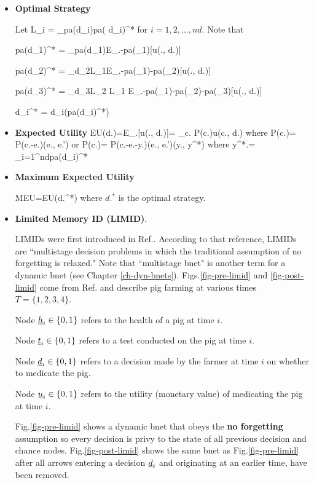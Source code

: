\begin{itemize}


\item{\bf Optimal Strategy}

Let
\beq
L_i = \lim_{pa(d_i)\rarrow pa( d_i)^*}
\eeq
for $i=1,2, \ldots, nd$.
Note that



\beq
pa(d_1)^* = \argmax_{pa(d_1)}E_{\rvc.-pa(\rvd_1)}[u(\rvc., d.)]
\eeq


\beq 
pa(d_2)^* = \argmax_{d_2}L_1E_{\rvc.-pa(\rvd_1)-pa(\rvd_2)}[u(\rvc., d.)]
\eeq

\beq 
pa(d_3)^* = \argmax_{d_3}L_2 L_1 E_{\rvc.-pa(\rvd_1)-pa(\rvd_2)-pa(\rvd_3)}[u(\rvc., d.)]
\eeq

\beq
d_i^* = d_i(pa(d_i)^*)
\eeq


\item {\bf Expected Utility}
\beq
EU(d.)=E_{\rvc.}[u(\rvc., d.)]=
\sum_{c.} P(c.)u(c., d.)
\eeq
where 
\beq
P(c.)= P(c.-e.)\delta(e., e.')
\eeq
or
\beq
P(c.)= P(c.-e.-y.)\delta(e., e.')\delta(y., y^*)
\eeq
where 
\beq 
y^*.= \cup_{i=1}^{nd}pa(d_i)^*
\eeq


\item {\bf Maximum Expected Utility}

\beq
MEU=EU(d.^*)
\eeq
where $d.^*$ is the optimal strategy.


\item {\bf Limited Memory ID (LIMID)}. 

LIMIDs were first introduced 
in Ref.\cite{limid-one}. According to that reference, LIMIDs are ``multistage decision problems in which the traditional assumption of no forgetting is
relaxed." 
Note that ``multistage bnet" is another term
for a dynamic bnet (see Chapter \ref{ch-dyn-bnets}).
Figs.\ref{fig-pre-limid} and \ref{fig-post-limid}
come from Ref.\cite{limid-one} and describe pig farming
at various times $T=\{1,2,3,4\}$.

Node ${\underline{h}}_i\in\{0,1\}$
refers to the health of a pig at time $i$.

Node ${\underline{t}}_i\in \{0,1\}$ refers to a test 
conducted on the pig at time $i$.

Node ${\underline{d}}_i\in \{0,1\}$ refers to a decision 
made by the farmer at time $i$ on whether to medicate the pig.

Node ${\underline{u}}_i\in \{0,1\}$ refers to the utility (monetary value)  
of medicating the pig at time $i$.

 
Fig.\ref{fig-pre-limid} shows a dynamic bnet that
obeys the {\bf no forgetting} assumption so every decision is
privy to the state of all previous decision and chance nodes.
Fig.\ref{fig-post-limid} shows the same bnet as 
Fig.\ref{fig-pre-limid} after all arrows entering a decision ${\underline{d}}_i$ and originating at an earlier time, have been removed.




\end{itemize}
